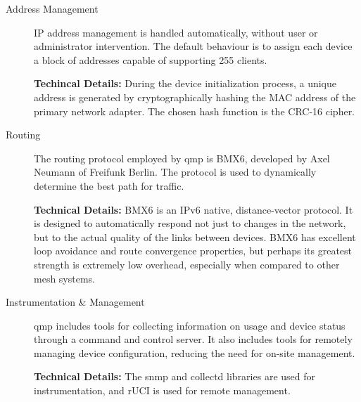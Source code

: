 \begin{description}
\item[Address Management] IP address management is handled automatically,
without user or administrator intervention. The default behaviour is to assign
each device a block of addresses capable of supporting 255 clients. \par 
{\bf Techincal Details:} During the device initialization
process, a unique address is generated by cryptographically hashing the MAC
address of the primary network adapter. The chosen hash function is the CRC-16
cipher. 
\item[Routing] The routing protocol employed by qmp is BMX6, developed
by Axel Neumann of Freifunk Berlin. The protocol is used to dynamically
determine the best path for traffic.
\par
{\bf Technical Details:}  BMX6 is an IPv6 native, distance-vector protocol.
It is designed to automatically respond not just to changes in the network, but to 
the actual quality of the links between devices. BMX6 has excellent loop
avoidance and route convergence properties, but perhaps its greatest strength is
extremely low overhead, especially when compared to other mesh systems.
\item[Instrumentation \& Management] qmp includes tools for collecting
information on usage and device status through a command and control server. It
also includes tools for remotely managing device configuration, reducing the
need for on-site management. \par
{\bf Technical Details:} The snmp and collectd libraries are used for
instrumentation, and rUCI is used for remote management.
\end{description}

